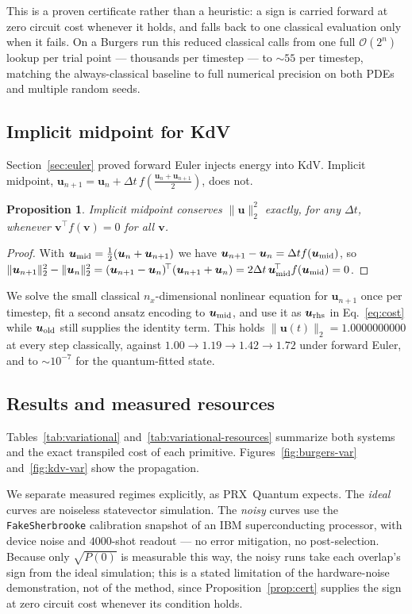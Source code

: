 \documentclass[aps,prx,twocolumn,notitlepage,superscriptaddress,floatfix,10pt]{revtex4-2}
\newtheorem{proposition}{Proposition}
\newcommand{\norm}[1]{\lVert #1 \rVert}
\newcommand{\Oh}{\mathcal{O}}
\begin{document}
This is a proven certificate rather than a heuristic: a sign is carried forward at zero circuit cost
whenever it holds, and falls back to one classical evaluation only when it fails. On a Burgers run
this reduced classical calls from one full $\Oh(2^n)$ lookup per trial point --- thousands per
timestep --- to $\sim55$ per timestep, matching the always-classical baseline to full numerical
precision on both PDEs and multiple random seeds.

\subsection{Implicit midpoint for KdV}
\label{sec:midpoint}

Section~\ref{sec:euler} proved forward Euler injects energy into KdV. Implicit midpoint,
$\bm u_{n+1}=\bm u_n+\Delta t\,f(\tfrac{\bm u_n+\bm u_{n+1}}{2})$, does not.

\begin{proposition}
Implicit midpoint conserves $\norm{\bm u}_2^2$ exactly, for any $\Delta t$, whenever
$\bm v^{\!\top}f(\bm v)=0$ for all $\bm v$.
\end{proposition}
\begin{proof}
With $\bm u_{\rm mid}=\tfrac12(\bm u_n+\bm u_{n+1})$ we have $\bm u_{n+1}-\bm u_n=\Delta t f(\bm
u_{\rm mid})$, so
$\norm{\bm u_{n+1}}_2^2-\norm{\bm u_n}_2^2=(\bm u_{n+1}-\bm u_n)^{\!\top}(\bm u_{n+1}+\bm u_n)
=2\Delta t\,\bm u_{\rm mid}^{\!\top}f(\bm u_{\rm mid})=0$.
\end{proof}

We solve the small classical $n_x$-dimensional nonlinear equation for $\bm u_{n+1}$ once per timestep,
fit a second ansatz encoding to $\bm u_{\rm mid}$, and use it as $\bm u_{\rm rhs}$ in
Eq.~\eqref{eq:cost} while $\bm u_{\rm old}$ still supplies the identity term. This holds
$\norm{\bm u(t)}_2=1.0000000000$ at every step classically, against $1.00\to1.19\to1.42\to1.72$ under
forward Euler, and to $\sim10^{-7}$ for the quantum-fitted state.

\subsection{Results and measured resources}

Tables~\ref{tab:variational} and~\ref{tab:variational-resources} summarize both systems and the exact
transpiled cost of each primitive. Figures~\ref{fig:burgers-var} and~\ref{fig:kdv-var} show the
propagation.

We separate measured regimes explicitly, as PRX~Quantum expects. The \emph{ideal} curves are
noiseless statevector simulation. The \emph{noisy} curves use the \texttt{FakeSherbrooke} calibration
snapshot of an IBM superconducting processor, with device noise and
$4000$-shot readout --- no error mitigation, no post-selection. Because only $\sqrt{P(0)}$ is
measurable this way, the noisy runs take each overlap's sign from the ideal simulation; this is a
stated limitation of the hardware-noise demonstration, not of the method, since
Proposition~\ref{prop:cert} supplies the sign at zero circuit cost whenever its condition holds.
\end{document}
